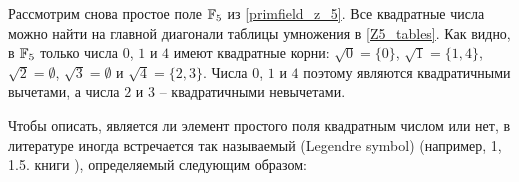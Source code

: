 \begin{example} 
\label{example:quadratic_residue_F5}
Рассмотрим снова простое поле $\mathbb{F}_5$ из \examplename{} \ref{primfield_z_5}. Все квадратные числа можно найти на главной диагонали таблицы умножения в \eqref{Z5_tables}. Как видно, в $ \mathbb{F}_5 $ только числа $ 0 $, $ 1 $ и $ 4 $ имеют квадратные корни: $ \sqrt{0} = \{0 \} $, $ \sqrt{1} = \{1,4 \} $, $ \sqrt{2} = \emptyset $, $ \sqrt{3} = \emptyset $ и $ \sqrt{4} = \{2,3 \} $. Числа $0$, $1$ и $4$ поэтому являются квадратичными вычетами, а числа $2$ и $3$ -- квадратичными невычетами.
\end{example}
Чтобы описать, является ли элемент простого поля квадратным числом или нет, в литературе иногда встречается так называемый  (Legendre symbol) (например, \chaptname{} 1, \secname{} 1.5. книги \cite{cohen-2010}), определяемый следующим образом:

